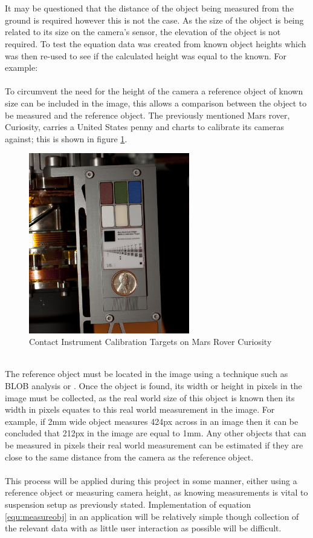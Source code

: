 	\\\\
	It may be questioned that the distance of the object being measured from the ground is required however this is not the case. As the size of the object is being related to its size on the camera's sensor, the elevation of the object is not required. To test the equation data was created from known object heights which was then re-used to see if the calculated height was equal to the known. For example:
	\\\\
	To circumvent the need for the height of the camera a reference object of known size can be included in the image, this allows a comparison between the object to be measured and the reference object. The previously mentioned Mars rover, Curiosity, carries a United States penny and charts to calibrate its cameras against; this is shown in figure \ref{fig:curiosity_calibration_chart}.
	\begin{figure}[h!]
		\centering
		\includegraphics[width=7cm]{../images/curiosity_calibration_chart.jpg}
		\caption{Contact Instrument Calibration Targets on Mars Rover Curiosity \citep{curiosity_image_calibration}}
		\label{fig:curiosity_calibration_chart}
	\end{figure}\\
	The reference object must be located in the image using a technique such as BLOB analysis or . Once the object is found, its width or height in pixels in the image must be collected, as the real world size of this object is known then its width in pixels equates to this real world measurement in the image. For example, if 2mm wide object measures 424px across in an image then it can be concluded that 212px in the image are equal to 1mm. Any other objects that can be measured in pixels their real world measurement can be estimated if they are close to the same distance from the camera as the reference object.
	\\\\
	This process will be applied during this project in some manner, either using a reference object or measuring camera height, as knowing measurements is vital to suspension setup as previously stated. Implementation of equation \ref{equ:measureobj} in an application will be relatively simple though collection of the relevant data with as little user interaction as possible will be difficult.